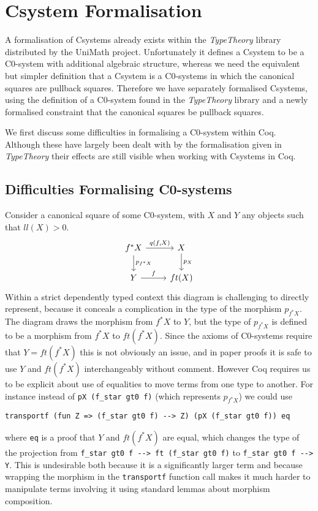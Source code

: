 \chapter{Csystem Formalisation}
A formalisation of Csystems already exists within the \textit{TypeTheory}
library distributed by the UniMath project. Unfortunately it defines a Csystem
to be a C0-system with additional algebraic structure, whereas we need the
equivalent but simpler definition that a Csystem is a C0-systems in which the
canonical squares are pullback squares. Therefore we have separately formalised
Csystems, using the definition of a C0-system found in the \textit{TypeTheory}
library and a newly formalised constraint that the canonical squares be pullback
squares.

We first discuss some difficulties in formalising a C0-system within Coq.
Although these have largely been dealt with by the formalisation given in
\textit{TypeTheory} their effects are still visible when working with Csystems
in Coq.

\section{Difficulties Formalising C0-systems}
Consider a canonical square of some C0-system, with $X$ and $Y$ any objects such
that $ll(X) > 0$.
\[
\begin{tikzcd}
    f^*X\ar[r,"{q(f,X)}"]\ar[d,"p_{f^*X}"]&X\ar[d,"p_X"] \\
    Y\ar[r,"f"]&ft(X)
\end{tikzcd}
\]
Within a strict dependently typed context this diagram is challenging to
directly represent, because it conceals a complication in the type of the
morphism $p_{f^*X}$. The diagram draws the morphism from $f^*X$ to $Y$, but the
type of $p_{f^*X}$ is defined to be a morphism from $f^*X$ to $ft(f^*X)$. Since
the axioms of C0-systems require that $Y=ft(f^*X)$ this is not obviously an
issue, and in paper proofs it is safe to use $Y$ and $ft(f^*X)$ interchangeably
without comment. However Coq requires us to be explicit about use of equalities
to move terms from one type to another. For instance instead of 
\lstinline|pX (f_star gt0 f)| (which represents $p_{f^*X}$) we could use
\begin{lstlisting}
transportf (fun Z => (f_star gt0 f) --> Z) (pX (f_star gt0 f)) eq
\end{lstlisting}
where \lstinline|eq| is a proof that $Y$ and $ft(f^*X)$ are equal, which changes
the type of the projection from \lstinline|f_star gt0 f --> ft (f_star gt0 f)|
to \lstinline|f_star gt0 f --> Y|. This is undesirable both because it is a
significantly larger term and because wrapping the morphism in the
\lstinline|transportf| function call makes it much harder to manipulate terms
involving it using standard lemmas about morphism composition.

